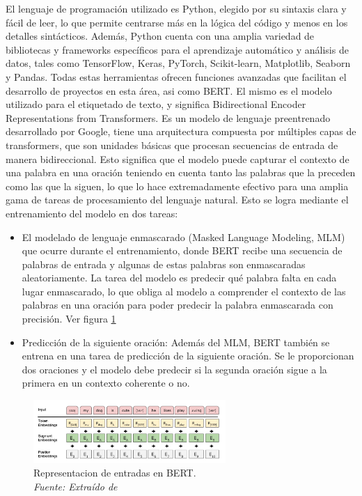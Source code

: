 El lenguaje de programación utilizado es Python, elegido por su sintaxis clara y fácil de leer, lo que permite centrarse más en la lógica del código y menos en los detalles sintácticos. Además, Python cuenta con una amplia variedad de bibliotecas y frameworks específicos para el aprendizaje automático y análisis de datos, tales como TensorFlow, Keras, PyTorch, Scikit-learn, Matplotlib, Seaborn y Pandas. Todas estas herramientas ofrecen funciones avanzadas que facilitan el desarrollo de proyectos en esta área, asi como BERT. El mismo es el modelo utilizado para el etiquetado de texto, y significa Bidirectional Encoder Representations from Transformers. Es un modelo de lenguaje preentrenado desarrollado por Google, tiene una arquitectura compuesta por múltiples capas de transformers, que son unidades básicas que procesan secuencias de entrada de manera bidireccional. Esto significa que el modelo puede capturar el contexto de una palabra en una oración teniendo en cuenta tanto las palabras que la preceden como las que la siguen, lo que lo hace extremadamente efectivo para una amplia gama de tareas de procesamiento del lenguaje natural. Esto se logra mediante el entrenamiento del modelo en dos tareas: 

\begin{itemize}
\item El modelado de lenguaje enmascarado (Masked Language Modeling, MLM) que ocurre durante el entrenamiento, donde BERT recibe una secuencia de palabras de entrada y algunas de estas palabras son enmascaradas aleatoriamente. La tarea del modelo es predecir qué palabra falta en cada lugar enmascarado, lo que obliga al modelo a comprender el contexto de las palabras en una oración para poder predecir la palabra enmascarada con precisión. Ver figura \ref{fig:nlp8}

\item Predicción de la siguiente oración: Además del MLM, BERT también se entrena en una tarea de predicción de la siguiente oración. Se le proporcionan dos oraciones y el modelo debe predecir si la segunda oración sigue a la primera en un contexto coherente o no.
\end{itemize}

\begin{figure}[h!]
	\includegraphics[width=0.65\textwidth]{capitulo3/figuras/nlp8.png}
	\caption{Representacion de entradas en BERT.
		\\\textit{Fuente: Extraído de} \protect\cite[p. 5]{devlin2018bert} }
	\label{fig:nlp8}
\end{figure}

